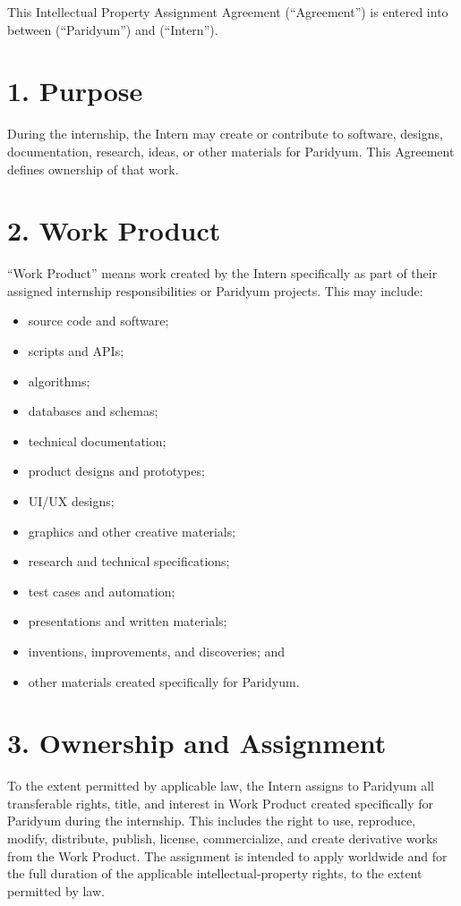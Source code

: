 \documentclass{paridyum}
\begin{document}
\paridyumletterhead
\paridyumdateref{\dkDocDate}{\dkDocRef}

This Intellectual Property Assignment Agreement (``Agreement'') is entered into
between \textbf{\dkOrgName} (``Paridyum'') and \textbf{\dkPIdentityLegalName} (``Intern'').

\section*{1. Purpose}
During the internship, the Intern may create or contribute to software, designs,
documentation, research, ideas, or other materials for Paridyum. This Agreement
defines ownership of that work.

\section*{2. Work Product}
``Work Product'' means work created by the Intern specifically as part of their
assigned internship responsibilities or Paridyum projects. This may include:
\begin{itemize}[leftmargin=*, noitemsep]
    \item source code and software;
    \item scripts and APIs;
    \item algorithms;
    \item databases and schemas;
    \item technical documentation;
    \item product designs and prototypes;
    \item UI/UX designs;
    \item graphics and other creative materials;
    \item research and technical specifications;
    \item test cases and automation;
    \item presentations and written materials;
    \item inventions, improvements, and discoveries; and
    \item other materials created specifically for Paridyum.
\end{itemize}

\section*{3. Ownership and Assignment}
To the extent permitted by applicable law, the Intern assigns to Paridyum all
transferable rights, title, and interest in Work Product created specifically for
Paridyum during the internship. This includes the right to use, reproduce, modify,
distribute, publish, license, commercialize, and create derivative works from the
Work Product. The assignment is intended to apply worldwide and for the full duration
of the applicable intellectual-property rights, to the extent permitted by law.
\end{document}
